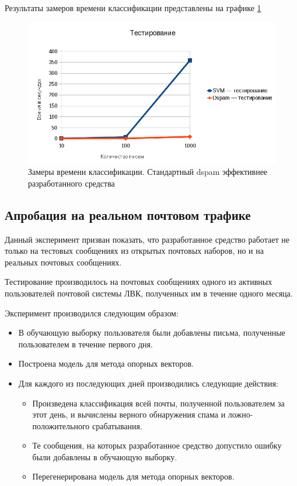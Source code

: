 Результаты замеров времени классификации представлены на графике \ref{EXTESTING}
\begin{figure}[h]
\begin{center}
\includegraphics[width=15cm]{img/testing}
\end{center}
\caption{Замеры времени классификации. Стандартный dspam эффективнее разработанного средства}
\label{EXTESTING}
\end{figure}

\subsection{Апробация на реальном почтовом трафике}
Данный эксперимент призван показать, что разработанное средство работает не только на тестовых сообщениях из открытых почтовых наборов, но и на реальных почтовых сообщениях.

Тестирование производилось на почтовых сообщениях одного из активных пользователей почтовой системы ЛВК, полученных им в течение одного месяца.

Эксперимент производился следующим образом: 
\begin{itemize}
\item В обучающую выборку пользователя были добавлены письма, полученные пользователем в течение первого дня.
\item Построена модель для метода опорных векторов.
\item Для каждого из последующих дней производились следующие действия:
	\begin{itemize}
		\item Произведена классификация всей почты, полученной пользователем за этот день, и вычислены верного обнаружения спама и ложно-положительного срабатывания.
		\item Те сообщения, на которых разработанное средство допустило ошибку были добавлены в обучающую выборку.
		\item Перегенерирована модель для метода опорных векторов.
	\end{itemize}
\end{itemize}

